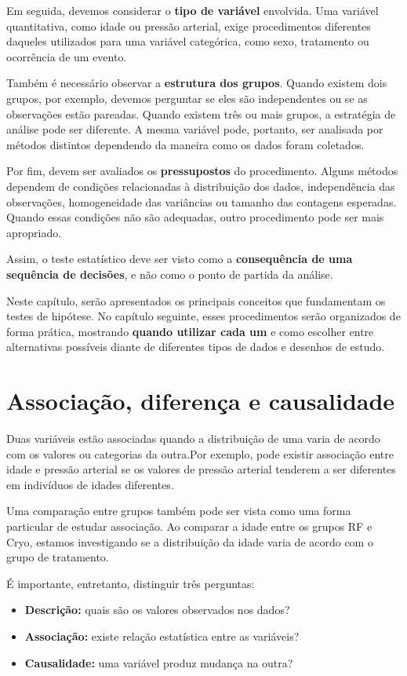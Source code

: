 Em seguida, devemos considerar o \textbf{tipo de variável} envolvida. Uma variável quantitativa, como idade ou pressão arterial, exige procedimentos diferentes daqueles utilizados para uma variável categórica, como sexo, tratamento ou ocorrência de um evento.

Também é necessário observar a \textbf{estrutura dos grupos}. Quando existem
dois grupos, por exemplo, devemos perguntar se eles são independentes ou se as observações estão pareadas. Quando existem três ou mais grupos, a estratégia de análise pode ser diferente. A mesma variável pode, portanto, ser analisada por métodos distintos dependendo da maneira como os dados foram coletados.

Por fim, devem ser avaliados os \textbf{pressupostos} do procedimento. Alguns
métodos dependem de condições relacionadas à distribuição dos dados,
independência das observações, homogeneidade das variâncias ou tamanho das
contagens esperadas. Quando essas condições não são adequadas, outro
procedimento pode ser mais apropriado.

Assim, o teste estatístico deve ser visto como a \textbf{consequência de uma
sequência de decisões}, e não como o ponto de partida da análise.

Neste capítulo, serão apresentados os principais conceitos que fundamentam os
testes de hipótese. No capítulo seguinte, esses procedimentos serão organizados de forma prática, mostrando \textbf{quando utilizar cada um} e como escolher entre alternativas possíveis diante de diferentes tipos de dados e desenhos de estudo.

\section{Associação, diferença e causalidade}

Duas variáveis estão associadas quando a distribuição de uma varia de acordo
com os valores ou categorias da outra.Por exemplo, pode existir associação entre idade e pressão arterial se os
valores de pressão arterial tenderem a ser diferentes em indivíduos de
idades diferentes.

Uma comparação entre grupos também pode ser vista como uma forma particular
de estudar associação. Ao comparar a idade entre os grupos RF e Cryo, estamos
investigando se a distribuição da idade varia de acordo com o grupo de
tratamento.

É importante, entretanto, distinguir três perguntas:

\begin{itemize}
    \item \textbf{Descrição:} quais são os valores observados nos dados?
    \item \textbf{Associação:} existe relação estatística entre as variáveis?
    \item \textbf{Causalidade:} uma variável produz mudança na outra?
\end{itemize}

